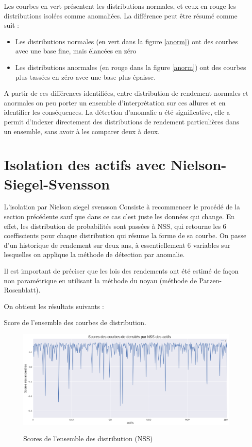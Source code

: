 Les courbes en vert présentent les distributions normales, et ceux en rouge les distributions isolées comme anomaliées. La différence peut être résumé  comme suit :
\begin{itemize}
\item Les distributions normales (en vert dans la figure \ref{anorm}) ont des courbes avec une base fine, mais élancées en zéro
\item  Les distributions anormales (en rouge dans la figure \ref{anorm}) ont des courbes plus tassées en zéro avec une base plus épaisse.
\end{itemize}

A partir de ces différences identifiées, entre distribution de rendement normales et anormales on peu porter un ensemble d'interprétation sur ces allures et en identifier les conséquences.
La détection d'anomalie a été significative, elle a permit d'indexer directement des distributions de rendement particulières dans un ensemble, sans avoir à les comparer deux à deux.

\section{Isolation des actifs avec Nielson-Siegel-Svensson}

L'isolation par Nielson siegel svensson Consiste à recommencer le procédé de la section précédente sauf que dans ce cas c'est juste les données qui change. En effet, les distribution de probabilités sont passées à NSS, qui retourne les 6 coeffiscients pour chaque distribution qui résume la forme de sa courbe. On passe d'un historique de rendement sur deux ans, à essentiellement 6 variables sur lesquelles on applique la méthode de détection par anomalie.

Il est important de préciser que les lois des rendements ont été estimé de façon non paramétrique en utilisant la méthode du noyau (méthode de Parzen-Rosenblatt).

On obtient les résultats suivants :

Score de l'ensemble des courbes de distribution.

\begin{figure}[H]
\centering
\caption{Scores de l'ensemble des distribution (NSS)}
   \includegraphics[scale=0.35]{img/scores_densite_nss_all.png}
 \label{anormm2}
\end{figure}


